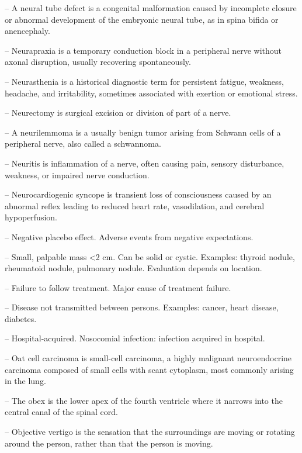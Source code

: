 -- A neural tube defect is a congenital malformation caused by incomplete closure or abnormal development of the embryonic neural tube, as in spina bifida or anencephaly.

-- Neurapraxia is a temporary conduction block in a peripheral nerve without axonal disruption, usually recovering spontaneously.

-- Neurasthenia is a historical diagnostic term for persistent fatigue, weakness, headache, and irritability, sometimes associated with exertion or emotional stress.

-- Neurectomy is surgical excision or division of part of a nerve.

-- A neurilemmoma is a usually benign tumor arising from Schwann cells of a peripheral nerve, also called a schwannoma.

-- Neuritis is inflammation of a nerve, often causing pain, sensory disturbance, weakness, or impaired nerve conduction.

-- Neurocardiogenic syncope is transient loss of consciousness caused by an abnormal reflex leading to reduced heart rate, vasodilation, and cerebral hypoperfusion.

-- Negative placebo effect. Adverse events from negative expectations.

-- Small, palpable mass <2 cm. Can be solid or cystic. Examples: thyroid nodule, rheumatoid nodule, pulmonary nodule. Evaluation depends on location.

-- Failure to follow treatment. Major cause of treatment failure.

-- Disease not transmitted between persons. Examples: cancer, heart disease, diabetes.

-- Hospital-acquired. Nosocomial infection: infection acquired in hospital.

-- Oat cell carcinoma is small-cell carcinoma, a highly malignant neuroendocrine carcinoma composed of small cells with scant cytoplasm, most commonly arising in the lung.

-- The obex is the lower apex of the fourth ventricle where it narrows into the central canal of the spinal cord.

-- Objective vertigo is the sensation that the surroundings are moving or rotating around the person, rather than that the person is moving.

